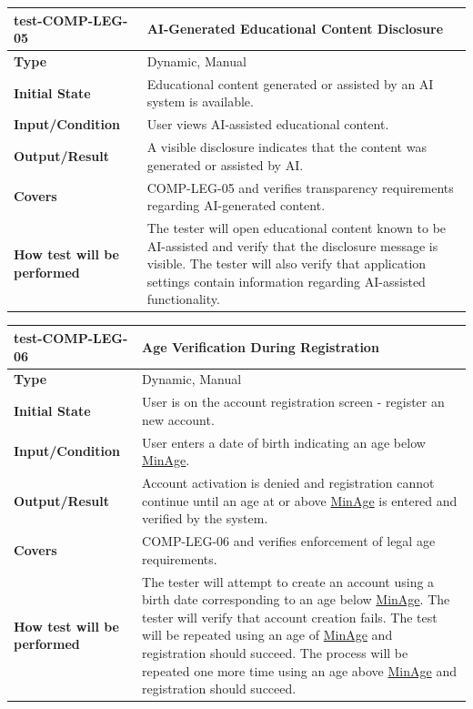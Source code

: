\documentclass[12pt, titlepage]{article}
\newcommand{\const}[1]{\hyperlink{const:#1}{\textsf{#1}}}
\begin{document}
\vspace{1em}

\noindent\begin{tabularx}{\textwidth}{>{\raggedright\arraybackslash}p{3.5cm}X}
  \toprule
  \textbf{test-COMP-LEG-05} & \textbf{AI-Generated Educational Content Disclosure}\\
  \midrule
  \textbf{Type} & Dynamic, Manual\\
  \textbf{Initial State} & Educational content generated or assisted by an AI system is available.\\
  \textbf{Input/Condition} & User views AI-assisted educational content.\\
  \textbf{Output/Result} & A visible disclosure indicates that the content was generated or assisted by AI.\\
  \textbf{Covers} & COMP-LEG-05 and verifies transparency requirements regarding AI-generated content.\\
  \textbf{How test will be performed} & The tester will open educational content known to be AI-assisted and verify that the disclosure message is visible. The tester will also verify that application settings contain information regarding AI-assisted functionality.\\
  \bottomrule
\end{tabularx}

\vspace{1em}

\noindent\begin{tabularx}{\textwidth}{>{\raggedright\arraybackslash}p{3.5cm}X}
  \toprule
  \textbf{test-COMP-LEG-06} & \textbf{Age Verification During Registration}\\
  \midrule
  \textbf{Type} & Dynamic, Manual\\
  \textbf{Initial State} & User is on the account registration screen - register an new account.\\
  \textbf{Input/Condition} & User enters a date of birth indicating an age below \const{MinAge}.\\
  \textbf{Output/Result} & Account activation is denied and registration cannot continue until an age at or above \const{MinAge} is entered and verified by the system.\\
  \textbf{Covers} & COMP-LEG-06 and verifies enforcement of legal age requirements.\\
  \textbf{How test will be performed} & The tester will attempt to create an account using a birth date corresponding to an age below \const{MinAge}. The tester will verify that account creation fails. The test will be repeated using an age of \const{MinAge} and registration should succeed. The process will be repeated one more time using an age above \const{MinAge} and registration should succeed.\\
  \bottomrule
\end{tabularx}
\end{document}
